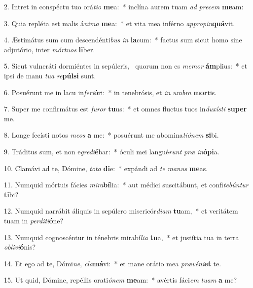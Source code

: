 2. Intret in conspéctu tuo orá\textit{ti}\textit{o} \textbf{me}a:~*  inclína aurem tuam \textit{ad} \textit{pre}\textit{cem} \textbf{me}am:\

3. Quia repléta est malis á\textit{ni}\textit{ma} \textbf{me}a:~*  et vita mea inférno \textit{ap}\textit{pro}\textit{pin}\textbf{quá}vit.\

4. Æstimátus sum cum descendénti\textit{bus} \textit{in} \textbf{la}cum:~*  factus sum sicut homo sine adjutório, inter \textit{mór}\textit{tu}\textit{os} \textbf{li}ber.\

5. Sicut vulneráti dormiéntes in sepúlcris, \dag\  quorum non es \textit{me}\textit{mor} \textbf{ám}plius:~*  et ipsi de manu \textit{tu}\textit{a} \textit{re}\textbf{púl}\textbf{si} sunt.\

6. Posuérunt me in lacu in\textit{fe}\textit{ri}\textbf{ó}ri:~*  in tenebrósis, et \textit{in} \textit{um}\textit{bra} \textbf{mor}tis.\

7. Super me confirmátus est \textit{fu}\textit{ror} \textbf{tu}us:~*  et omnes fluctus tuos in\textit{du}\textit{xís}\textit{ti} \textbf{su}\textbf{per} me.\

8. Longe fecísti notos \textit{me}\textit{os} \textbf{a} me:~*  posuérunt me abomina\textit{ti}\textit{ó}\textit{nem} \textbf{si}bi.\

9. Tráditus sum, et non e\textit{gre}\textit{di}\textbf{é}bar:~*  óculi mei langué\textit{runt} \textit{præ} \textit{in}\textbf{ó}\textbf{pi}a.\

10. Clamávi ad te, Dómine, \textit{to}\textit{ta} \textbf{di}e:~*  expándi ad \textit{te} \textit{ma}\textit{nus} \textbf{me}as.\

11. Numquid mórtuis fácies \textit{mi}\textit{ra}\textbf{bí}lia:~*  aut médici suscitábunt, et confi\textit{te}\textit{bún}\textit{tur} \textbf{ti}bi?\

12. Numquid narrábit áliquis in sepúlcro misericór\textit{di}\textit{am} \textbf{tu}am,~*  et veritátem tuam in \textit{per}\textit{di}\textit{ti}\textbf{ó}ne?\

13. Numquid cognoscéntur in ténebris mirabí\textit{li}\textit{a} \textbf{tu}a,~*  et justítia tua in terra \textit{ob}\textit{li}\textit{vi}\textbf{ó}nis?\

14. Et ego ad te, Dómi\textit{ne}, \textit{cla}\textbf{má}vi:~*  et mane orátio mea \textit{præ}\textit{vé}\textit{ni}\textbf{et} te.\

15. Ut quid, Dómine, repéllis orati\textit{ó}\textit{nem} \textbf{me}am:~*  avértis fáci\textit{em} \textit{tu}\textit{am} \textbf{a} me?\

